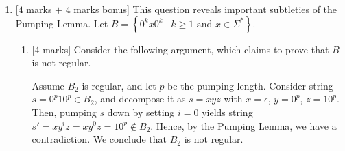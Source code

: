 \documentclass{article}
\newcommand{\set}[1]{{\left\{#1\right\}}}    %
\begin{document}
\begin{enumerate}
\begin{enumerate}
\begin{proof}
            \end{proof}
            \item $L=\set{1^n0^m1^n\mid m\text{, }n\geq 0}$.
            \begin{proof}
            For a proof by contradiction assume L is a regular language.\\
            This implies that $\exists$ a pumping length p.\\
            Choose $s =1^p0^m1^p$\\
            $s\in L$\\
            $|s|=2p+m \geq p$\\
            The conditions for the pumping are met\\
            $\exists x, y, z$ s.t. $s=xyz$ and $|xy|\leq p \therefore$ every character in x and y is a 1 and y 
            contains at least one 1.
            $xy^2z = 1^(p')0^m1^p$ where $p'\geq p \therefore xy^2z \notin L$ This is a contradiction. 
            \end{proof}
            \item $L=\set{x\mid x\in\set{0,1}^*\text{ is not a palindrome}}$. Recall a palindrome is a string that looks the same forwards and backwards. Examples of palindromes are ``madam'' and ``racecar''.\\
            \begin{proof}
            For a proof by contradiction assume L is a regular language.\\
            This implies that $\exists$ a pumping length p.\\
            Choose $s = $
            \end{proof}
        \end{enumerate}
    \item  {[$4$ marks $+$ $4$ marks bonus]} This question reveals important subtleties of the Pumping Lemma. Let $B=\set{0^kx0^k \mid k\geq 1\text{ and } x\in\Sigma^*}$.
                \begin{enumerate}
                \item{[4 marks]} Consider the following argument, which claims to prove that $B$ is not regular.

                    Assume $B_2$ is regular, and let $p$ be the pumping length. Consider string $s=0^p10^p\in B_2$, and decompose it as $s=xyz$ with $x=\epsilon$, $y=0^p$, $z=10^p$. Then, pumping $s$ down by setting $i=0$ yields string $s'=xy^iz=xy^0z=10^p\not \in B_2$. Hence, by the Pumping Lemma, we have a contradiction. We conclude that $B_2$ is not regular.


\end{enumerate}
\end{enumerate}
\end{document}
